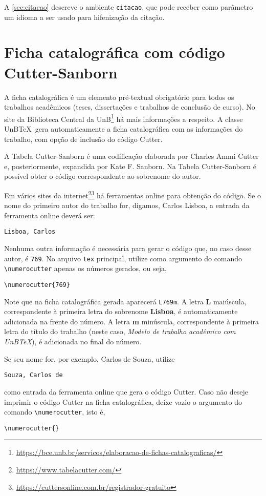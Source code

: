 A \cref{sec:citacao} descreve o ambiente \texttt{citacao}, que pode receber como parâmetro um idioma a ser usado para hifenização da citação.

\section{Ficha catalográfica com código Cutter-Sanborn}

A ficha catalográfica é um elemento pré-textual obrigatório para todos os trabalhos acadêmicos (teses, dissertações e trabalhos de conclusão de curso). No site da Biblioteca Central da UnB\footnote{\url{https://bce.unb.br/servicos/elaboracao-de-fichas-catalograficas/}} há mais informações a respeito. A classe UnB\TeX\ gera automaticamente a ficha catalográfica com as informações do trabalho, com opção de inclusão do código Cutter.

A Tabela Cutter-Sanborn é uma codificação elaborada por Charles Ammi Cutter e, posteriormente, expandida por Kate F. Sanborn. Na Tabela Cutter-Sanborn é possível obter o código correspondente ao sobrenome do autor.

Em vários sites da internet\footnote{\url{https://www.tabelacutter.com/}}\footnote{\url{https://cuttersonline.com.br/registrador-gratuito}} há ferramentas online para obtenção do código. Se o nome do primeiro autor do trabalho for, digamos, Carlos Lisboa, a entrada da ferramenta online deverá ser: 
\begin{verbatim}
Lisboa, Carlos
\end{verbatim}
Nenhuma outra informação é necessária para gerar o código que, no caso desse autor, é \texttt{769}. No arquivo \texttt{tex} principal, utilize como argumento do comando \verb|\numerocutter| apenas os números gerados, ou seja,
\begin{verbatim}
\numerocutter{769}
\end{verbatim}
Note que na ficha catalográfica gerada aparecerá \texttt{L769m}. A letra \textbf{L} maiúscula, correspondente à primeira letra do sobrenome \textbf{Lisboa}, é automaticamente adicionada na frente do número. A letra \textbf{m} minúscula, correspondente à primeira letra do título do trabalho (neste caso, \emph{Modelo de trabalho acadêmico com UnB\TeX}), é adicionada no final do número.

Se seu nome for, por exemplo, Carlos de Souza, utilize 
\begin{verbatim}
Souza, Carlos de
\end{verbatim}
como entrada da ferramenta online que gera o código Cutter. Caso não deseje imprimir o código Cutter na ficha catalográfica, deixe vazio o argumento do comando \verb|\numerocutter|, isto é,
\begin{verbatim}
\numerocutter{}
\end{verbatim}


